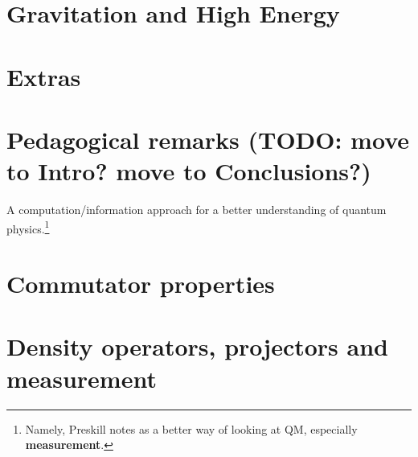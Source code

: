 \documentclass{book}
\begin{document}
\chapter{Gravitation and High Energy}



\chapter{Extras}


\chapter{Pedagogical remarks (TODO: move to Intro? move to Conclusions?)}
A computation/information approach for a better understanding of quantum
physics.\footnote{
  Namely, Preskill notes \cite{PreskillNotes} as a better way of looking at QM,
  especially \textbf{measurement}.
}

\appendix
\chapter{Commutator properties}

\chapter{Density operators, projectors and measurement}


\printbibliography[title=References]
\end{document}
